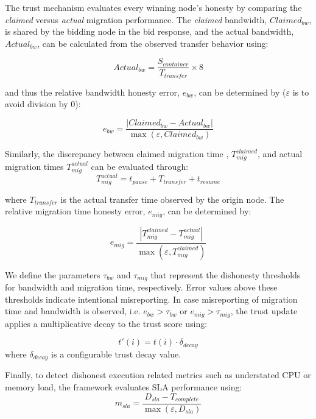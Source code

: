 \documentclass{article}
\begin{document}
The trust mechanism evaluates every winning node's honesty by comparing the \textit{claimed} versus \textit{actual} migration performance. The \textit{claimed} bandwidth, $Claimed_{bw}$, is shared by the bidding node in the bid response, and the actual bandwidth, $Actual_{bw}$,  can be calculated from the observed transfer behavior using:
 
\begin{equation}
Actual_{bw}=\frac{S_{container}}{T_{transfer}}\times 8
\label{eq:actual_bw}
\end{equation}

and thus the relative bandwidth honesty error, $e_{bw}$,  can be determined by ($\varepsilon$ is to avoid division by 0): 
  
\begin{equation}
e_{bw}=\frac{|Claimed_{bw}-Actual_{bw}|}{\max(\varepsilon,Claimed_{bw})}
\label{eq:ebw}
\end{equation}

Similarly, the discrepancy between claimed migration time , $T^{claimed}_{mig}$, and actual migration times $T^{actual}_{mig}$ can be evaluated through:  
\begin{equation}
T^{actual}_{mig}=t_{pause}+T_{transfer}+t_{resume}
\label{eq:tmig_actual}
\end{equation}

where $T_{transfer}$ is the actual transfer time observed by the origin node. The relative migration time honesty error, $e_{mig}$,  can be determined by: 

\begin{equation}
e_{mig}=\frac{|T^{claimed}_{mig}-T^{actual}_{mig}|}{\max(\varepsilon,T^{claimed}_{mig})}
\label{eq:emig}
\end{equation}

We define the parameters \(\tau_{bw}\) and \(\tau_{mig}\) that represent the dishonesty thresholds for bandwidth and migration time, respectively. Error values above these thresholds indicate intentional misreporting. In case misreporting of migration time and bandwidth is observed, i.e. \(e_{bw}>\tau_{bw}\) or \(e_{mig}>\tau_{mig}\), the trust update applies a multiplicative decay to the trust score using:
  
\begin{equation}
t'(i)=t(i)\cdot \delta_{decay}
\label{eq:decay_phase}
\end{equation}
where $\delta_{decay}$ is a configurable trust decay value.

Finally, to detect dishonest execution related metrics such as understated CPU or memory load, the framework evaluates SLA performance using:  
\begin{equation}
m_{sla}=\frac{D_{sla}-T_{complete}}{\max(\varepsilon,D_{sla})}
\label{eq:msla}
\end{equation}
\end{document}
